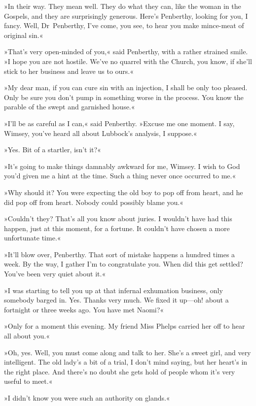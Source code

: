 »In their way. They mean well. They do what they can, like the woman in the Gospels, and they are surprisingly generous. Here's Penberthy, looking for you, I fancy. Well, Dr~Penberthy, I've come, you see, to hear you make mince-meat of original sin.«

»That's very open-minded of you,« said Penberthy, with a rather strained smile. »I hope you are not hostile. We've no quarrel with the Church, you know, if she'll stick to her business and leave us to ours.«

»My dear man, if you can cure sin with an injection, I shall be only too pleased. Only be sure you don't pump in something worse in the process. You know the parable of the swept and garnished house.«

»I'll be as careful as I can,« said Penberthy. »Excuse me one moment. I say, Wimsey, you've heard all about Lubbock's analysis, I suppose.«

»Yes. Bit of a startler, isn't it?«

»It's going to make things damnably awkward for me, Wimsey. I wish to God you'd given me a hint at the time. Such a thing never once occurred to me.«

»Why should it? You were expecting the old boy to pop off from heart, and he did pop off from heart. Nobody could possibly blame you.«

»Couldn't they? That's all you know about juries. I wouldn't have had this happen, just at this moment, for a fortune. It couldn't have chosen a more unfortunate time.«

»It'll blow over, Penberthy. That sort of mistake happens a hundred times a week. By the way, I gather I'm to congratulate you. When did this get settled? You've been very quiet about it.«

»I was starting to tell you up at that infernal exhumation business, only somebody barged in. Yes. Thanks very much. We fixed it up—oh! about a fortnight or three weeks ago. You have met Naomi?«

»Only for a moment this evening. My friend Miss Phelps carried her off to hear all about you.«

»Oh, yes. Well, you must come along and talk to her. She's a sweet girl, and very intelligent. The old lady's a bit of a trial, I don't mind saying, but her heart's in the right place. And there's no doubt she gets hold of people whom it's very useful to meet.«

»I didn't know you were such an authority on glands.«

